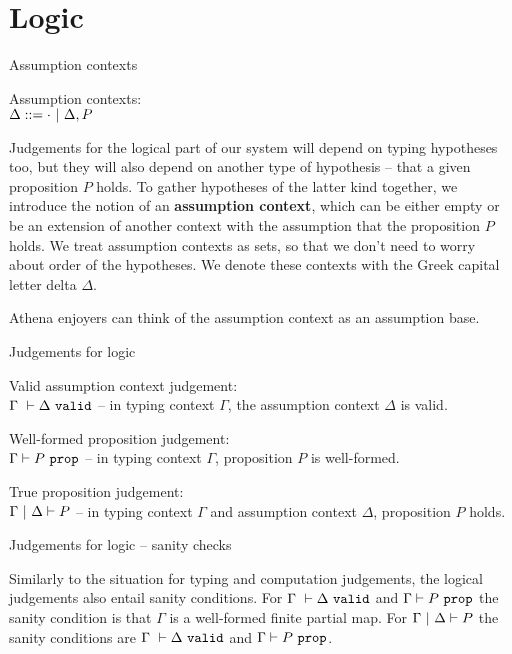 \documentclass{beamer}
\begin{document}
\section{Logic}

\begin{frame}{Assumption contexts}

Assumption contexts: \\
$\Delta ::= \cdot \ |\  \Delta, P$

\vspace{1em}

Judgements for the logical part of our system will depend on typing hypotheses too, but they will also depend on another type of hypothesis -- that a given proposition $P$ holds. To gather hypotheses of the latter kind together, we introduce the notion of an \textbf{assumption context}, which can be either empty or be an extension of another context with the assumption that the proposition $P$ holds. We treat assumption contexts as sets, so that we don't need to worry about order of the hypotheses. We denote these contexts with the Greek capital letter delta $\Delta$.

\vspace{1em}

Athena enjoyers can think of the assumption context as an assumption base.

\end{frame}

\begin{frame}{Judgements for logic}

Valid assumption context judgement: \\
$\assctx[\Gamma]{\Delta}$ -- in typing context $\Gamma$, the assumption context $\Delta$ is valid.

\vspace{2em}

Well-formed proposition judgement: \\
$\prop[\Gamma]{P}$ -- in typing context $\Gamma$, proposition $P$ is well-formed.

\vspace{2em}

True proposition judgement: \\
$\holds{P}$ -- in typing context $\Gamma$ and assumption context $\Delta$, proposition $P$ holds.

\end{frame}

\begin{frame}{Judgements for logic -- sanity checks}

Similarly to the situation for typing and computation judgements, the logical judgements also entail sanity conditions. For $\assctx[\Gamma]{\Delta}$ and $\prop[\Gamma]{P}$ the sanity condition is that $\Gamma$ is a well-formed finite partial map. For $\holds{P}$ the sanity conditions are $\assctx[\Gamma]{\Delta}$ and $\prop[\Gamma]{P}$.

\end{frame}
\end{document}
